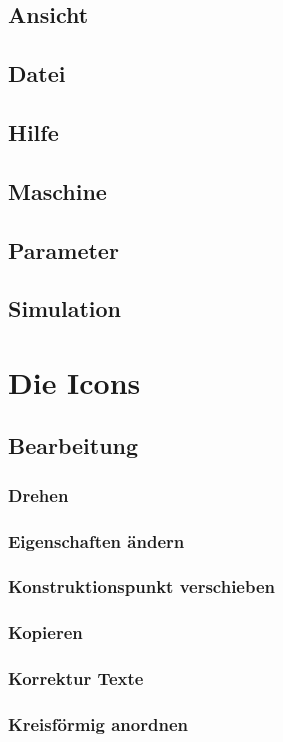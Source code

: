 \documentclass[a4paper]{book}
\begin{document}
		\subsection{Ansicht}
		\subsection{Datei}
		\subsection{Hilfe}
		\subsection{Maschine}
		\subsection{Parameter}
		\subsection{Simulation}
	\section{Die Icons}
		\subsection{Bearbeitung}
			\subsubsection{Drehen}
			\subsubsection{Eigenschaften ändern}
			\subsubsection{Konstruktionspunkt verschieben}
			\subsubsection{Kopieren}
			\subsubsection{Korrektur Texte}
			\subsubsection{Kreisförmig anordnen}
\end{document}
